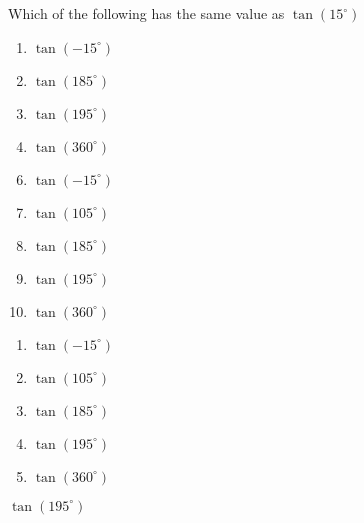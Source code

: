 

  Which of the following has the same value as $\tan(15^\circ)$ 


\ifsat
	\begin{enumerate}[label=\Alph*)]
		\item    $\tan(-15^\circ)$
		\item $\tan(185^\circ)$ 
		\item $\tan(195^\circ)$ %
		\item $\tan(360^\circ)$
	\end{enumerate}
\else
\fi

\ifacteven
	\begin{enumerate}[label=\textbf{\Alph*.},itemsep=\fill,align=left]
		\setcounter{enumii}{5}
		\item    $\tan(-15^\circ)$
		\item  $\tan(105^\circ)$ 
		\item $\tan(185^\circ)$ 
		\addtocounter{enumii}{1}
		\item $\tan(195^\circ)$ %
		\item $\tan(360^\circ)$
	\end{enumerate}
\else
\fi

\ifactodd
	\begin{enumerate}[label=\textbf{\Alph*.},itemsep=\fill,align=left]
		\item    $\tan(-15^\circ)$
		\item  $\tan(105^\circ)$ 
		\item $\tan(185^\circ)$ 
		\item $\tan(195^\circ)$ %
		\item $\tan(360^\circ)$
	\end{enumerate}
\else
\fi

\ifgridin
 $\tan(195^\circ)$ %
		
\else
\fi

